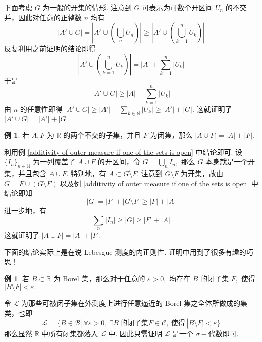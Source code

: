 \documentclass[12pt, a4paper, oneside]{book}
\numberwithin{figure}{section}
\theoremstyle{definition}
\newtheorem{example}[theorem]{例}
\begin{document}
下面考虑 $G$ 为一般的开集的情形. 注意到 $G$ 可表示为可数个开区间 $U_n$ 的不交并，因此对任意的正整数 $n$ 均有
\begin{equation}
    |A'\cup G|=\left|A'\cup \left(\bigcup_n U_n\right)\right|\geq \left|A'\cup \left(\bigcup_{k=1}^n U_k\right)\right|
\end{equation}
反复利用之前证明的结论即得
\begin{equation}
    \left|A'\cup \left(\bigcup_{k=1}^n U_k\right)\right|=|A|+\sum_{k=1}^n |U_k|
\end{equation}
于是
\begin{equation}
    |A'\cup G|\geq |A|+\sum_{k=1}^n |U_k|
\end{equation}
由 $n$ 的任意性即得 $|A'\cup G|\geq |A'|+\sum_{k\in\mathbb N}|U_k|\geq |A'|+|G|.$ 这就证明了 $|A'\cup G|=|A'|+|G|.$

\begin{example}\label{additivity of outer measure if one of the sets is closed}
    若 $A,F$ 为 $\mathbb R$ 的两个不交的子集，并且 $F$ 为闭集，那么 $|A\cup F|=|A|+|F|.$
\end{example}

利用例 \eqref{additivity of outer measure if one of the sets is open} 中结论即可. 设 $\{I_n\}_{n\in\mathbb N}$ 为一列覆盖了 $A\cup F$ 的开区间，令 $G=\bigcup_n I_n,$ 那么 $G$ 本身就是一个开集，并且包含 $A\cup F.$ 
特别地，有 $A\subset G\setminus F.$ 注意到 $G\setminus F$ 为开集，故由 $G=F\cup (G\setminus F)$ 以及例 \eqref{additivity of outer measure if one of the sets is open} 中结论即知
\begin{equation}
    |G|=|F|+|G\setminus F|\geq |F|+|A|
\end{equation}
进一步地，有
\begin{equation}
    \sum_n |I_n|\geq |G|\geq |F|+|A|
\end{equation}
这就证明了 $|A\cup F|=|A|+|F|.$

下面的结论实际上是在说 Lebesgue 测度的内正则性. 证明中用到了很多有趣的巧思！
\begin{example}\label{inner regularity of Lebesgue measure}
    若 $B\subset\mathbb R$ 为 Borel 集，那么对于任意的 $\varepsilon>0,$ 均存在 $B$ 的闭子集 $F,$ 使得 $|B\setminus F|<\varepsilon.$
\end{example}

令 $\mathcal L$ 为那些可被闭子集在外测度上进行任意逼近的 Borel 集之全体所做成的集类，也即
\begin{equation}
    \mathcal L=\{B\in\mathcal B|\ \forall\varepsilon>0,\ \exists B\ \text{的闭子集} F\in\mathcal C,\ \text{使得}\ |B\setminus F|<\varepsilon\}
\end{equation}
那么显然 $\mathbb R$ 中所有闭集都落入 $\mathcal L$ 中. 因此只需证明 $\mathcal L$ 是一个 $\sigma-$代数即可.
\end{document}
